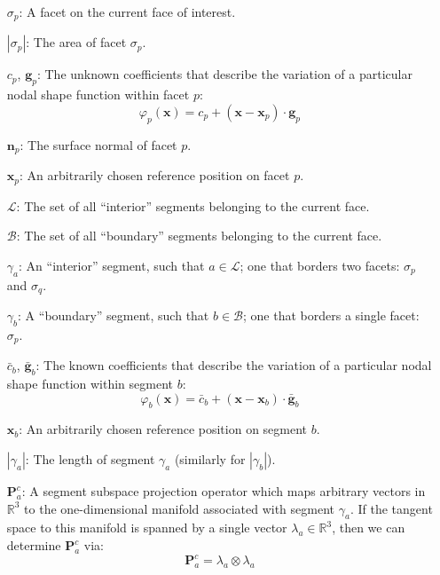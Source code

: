 \documentclass[11pt]{article} %
\begin{document}
\begin{itemize}
	\item[$\sigma_p$:] A facet on the current face of interest.
	\item[$| \sigma_p |$:] The area of facet $\sigma_p$.
	\item[$c_p$, $\mathbf{g}_p$:] The unknown coefficients that describe the variation of a particular nodal shape function within facet $p$:
	\begin{equation}
		\varphi_p (\mathbf{x}) = c_p + (\mathbf{x} - \mathbf{x}_p) \cdot \mathbf{g}_p
	\end{equation}
	\item[$\mathbf{n}_p$:] The surface normal of facet $p$.
	\item[$\mathbf{x}_p$:] An arbitrarily chosen reference position on facet $p$.
	\item[$\mathcal{L}$:] The set of all ``interior'' segments belonging to the current face.
	\item[$\mathcal{B}$:] The set of all ``boundary'' segments belonging to the current face.
	\item[$\gamma_a$:] An ``interior'' segment, such that $a \in \mathcal{L}$; one that borders two facets: $\sigma_p$ and $\sigma_q$.
	\item[$\gamma_b$:] A ``boundary'' segment, such that $b \in \mathcal{B}$; one that borders a single facet: $\sigma_p$.
	\item[$\bar{c}_b$, $\bar{\mathbf{g}}_b$:] The known coefficients that describe the variation of a particular nodal shape function within segment $b$:
	\begin{equation}
		\varphi_b (\mathbf{x}) = \bar{c}_b + (\mathbf{x} - \mathbf{x}_b) \cdot \bar{\mathbf{g}}_b
	\end{equation}
	\item[$\mathbf{x}_b$:] An arbitrarily chosen reference position on segment $b$.
	\item[$| \gamma_a |$:] The length of segment $\gamma_a$ (similarly for $| \gamma_b |$).
	\item[$\mathbf{P}^c_a$:] A segment subspace projection operator which maps arbitrary vectors in $\mathbb{R}^3$ to the one-dimensional manifold associated with segment $\gamma_a$. If the tangent space to this manifold is spanned by a single vector $\lambda_a \in \mathbb{R}^3$, then we can determine $\mathbf{P}^c_a$ via:
	\begin{equation}
		\mathbf{P}^c_a = \lambda_a \otimes \lambda_a
	\end{equation}

\end{itemize}
\end{document}
